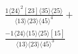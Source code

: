 \documentclass[varwidth, border=5pt]{standalone}
\begin{document}
\begin{my}
$\begin{gathered}
\scriptscriptstyle\frac{1⟨24⟩^2[23]⟨35⟩⟨25⟩}{⟨13⟩⟨23⟩⟨45⟩^4}+\\
\scriptscriptstyle\frac{-1⟨24⟩⟨15⟩⟨25⟩[15]}{⟨13⟩⟨23⟩⟨45⟩^3}\phantom{+}
\end{gathered}$
\end{my}
\end{document}
